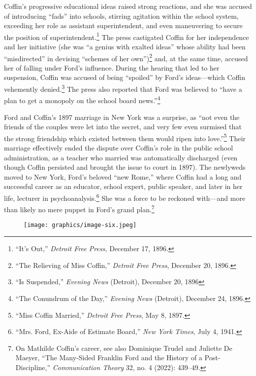 \documentclass[openany,nobib]{tufte-book}
\begin{document}
Coffin's progressive educational ideas raised strong reactions, and she
was accused of introducing ``fads'' into schools, stirring agitation
within the school system, exceeding her role as assistant
superintendent, and even maneuvering to secure the position of
superintendent.\footnote{``It's Out,'' \emph{Detroit Free Press,}
  December 17, 1896.} The press castigated Coffin for her independence
and her initiative (she was ``a genius with exalted ideas'' whose
ability had been ``misdirected'' in devising ``schemes of her
own'')\footnote{``The Relieving of Miss Coffin,'' \emph{Detroit Free
  Press}, December 20, 1896.} and, at the same time, accused her of
falling under Ford's influence. During the hearing that led to her
suspension, Coffin was accused of being ``spoiled'' by Ford's
ideas---which Coffin vehemently denied.\footnote{``Is Suspended,''
  \emph{Evening News} (Detroit), December 20, 1896} The press also
reported that Ford was believed to ``have a plan to get a monopoly on
the school board news.''\footnote{``The Conundrum of the Day,''
  \emph{Evening News} (Detroit), December 24, 1896.}

Ford and Coffin's 1897 marriage in New York was a surprise, as ``not
even the friends of the couples were let into the secret, and very few
even surmised that the strong friendship which existed between them
would ripen into love.''\footnote{``Miss Coffin Married,'' \emph{Detroit
  Free Press}, May 8, 1897.} Their marriage effectively ended the
dispute over Coffin's role in the public school administration, as a
teacher who married was automatically discharged (even though Coffin
persisted and brought the issue to court in 1897). The newlyweds moved
to New York, Ford's beloved ``new Rome,'' where Coffin had a long and
successful career as an educator, school expert, public speaker, and
later in her life, lecturer in psychoanalysis.\footnote{``Mrs. Ford,
  Ex-Aide of Estimate Board,'' \emph{New York Times}, July 4, 1941.} She
was a force to be reckoned with---and more than likely no mere puppet in
Ford's grand plan.\footnote{On Mathilde Coffin's career, see also
  Dominique Trudel and Juliette De Maeyer, ``The Many-Sided Franklin
  Ford and the History of a Post-Discipline,'' \emph{Communication
  Theory} 32, no. 4 (2022): 439--49.}

\begin{figure}
   \texttt{[image: graphics/image-six.jpeg]}
   \label{fig:fig6}
\end{figure}
\end{document}

